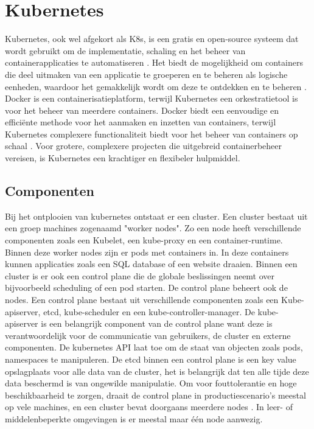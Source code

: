 \section{Kubernetes}
Kubernetes, ook wel afgekort als K8s, is een gratis en open-source systeem dat wordt gebruikt om de implementatie, schaling en het beheer van containerapplicaties te automatiseren \autocite{KubernetesDocs-2023}. 
Het biedt de mogelijkheid om containers die deel uitmaken van een applicatie te groeperen en te beheren als logische eenheden, waardoor het gemakkelijk wordt om deze te ontdekken en te beheren \autocite{KubernetesDocs-2023}.
Docker is een containerisatieplatform, terwijl Kubernetes een orkestratietool is voor het beheer van meerdere containers.
Docker biedt een eenvoudige en efficiënte methode voor het aanmaken en inzetten van containers, terwijl Kubernetes complexere functionaliteit biedt voor het beheer van containers op schaal \autocite{banerjee-2023}.
Voor grotere, complexere projecten die uitgebreid containerbeheer vereisen, is Kubernetes een krachtiger en flexibeler hulpmiddel.

\subsection{Componenten}
\autocite{KubernetesDocs-2023} Bij het ontplooien van kubernetes ontstaat er een cluster. Een cluster bestaat uit een groep machines zogenaamd "worker nodes". Zo een node heeft verschillende componenten zoals een Kubelet, een kube-proxy en een container-runtime.
Binnen deze worker nodes zijn er pods met containers in. In deze containers kunnen applicaties zoals een SQL database of een website draaien. 
\autocite{KubernetesDocs-2023} Binnen een cluster is er ook een control plane die de globale beslissingen neemt over bijvoorbeeld scheduling of een pod starten. De control plane beheert ook de nodes. 
\autocite{KubernetesDocs-2023} Een control plane bestaat uit verschillende componenten zoals een Kube-apiserver, etcd, kube-scheduler en een kube-controller-manager. 
De kube-apiserver is een belangrijk component van de control plane want deze is verantwoordelijk voor de communicatie van gebruikers, de cluster en externe componenten. 
De kubernetes API laat toe om de staat van objecten zoals pods, namespaces te manipuleren.
De etcd binnen een control plane is een key value opslagplaats voor alle data van de cluster, het is belangrijk dat ten alle tijde deze data beschermd is van ongewilde manipulatie. 
Om voor fouttolerantie en hoge beschikbaarheid te zorgen, draait de control plane in productiescenario's meestal op vele machines, en een cluster bevat doorgaans meerdere nodes \autocite{KubernetesDocs-2023}. 
In leer- of middelenbeperkte omgevingen is er meestal maar één node aanwezig.

